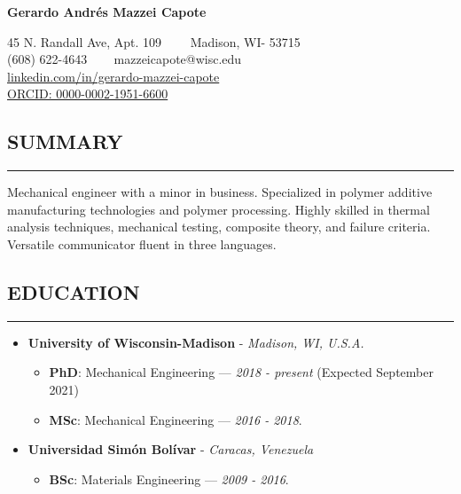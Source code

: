 \documentclass[11pt,letterpaper]{article}
\newenvironment{indentsection}[1]%
{\begin{list}{}%
	{\setlength{\leftmargin}{#1}}%
	\item[]%
}
{\end{list}}
\begin{document}
	\thispagestyle{firststyle}

	
\begin{center}
	{\LARGE \textbf{Gerardo Andrés Mazzei Capote}}

	45 N. Randall Ave, Apt. 109\ \ \textbullet
	\ \ Madison, WI- 53715
	\\
	(608) 622-4643 \ \textbullet
	\ \ mazzeicapote@wisc.edu\\
	\href{https://www.linkedin.com/in/gerardo-mazzei-capote}{linkedin.com/in/gerardo-mazzei-capote}\\
	\href{https://orcid.org/0000-0002-1951-6600}{ORCID: 0000-0002-1951-6600}
	
\end{center}

\vspace{-1em}

\subsection*{SUMMARY}
	\vspace{-0.5em}
	\hrule
	\vspace{0.4em}
	\begin{indentsection}{\parindent}
	Mechanical engineer with a minor in business. Specialized in polymer additive manufacturing technologies and polymer processing. Highly skilled in thermal analysis techniques, mechanical testing, composite theory, and failure criteria. Versatile communicator fluent in three languages.
	\end{indentsection}


\subsection*{EDUCATION}
	\vspace{-0.5em}
	\hrule
	\vspace{0.4em}
	\begin{itemize}
	\item
	\textbf{University of Wisconsin-Madison} - \emph{Madison, WI, U.S.A.}
	\begin{itemize}	
	\item
	\textbf{PhD}: Mechanical Engineering --- \emph{2018 - present} (Expected September 2021) 
	\item
	\textbf{MSc}: Mechanical Engineering --- \emph{2016 - 2018}. 
\end{itemize}

	\item
	\textbf{Universidad Simón Bolívar} - \emph{Caracas, Venezuela}
	\begin{itemize}	
		\item
		\textbf{BSc}: Materials Engineering --- \emph{2009 - 2016}. 
	\end{itemize}
	\end{itemize}
\end{document}
